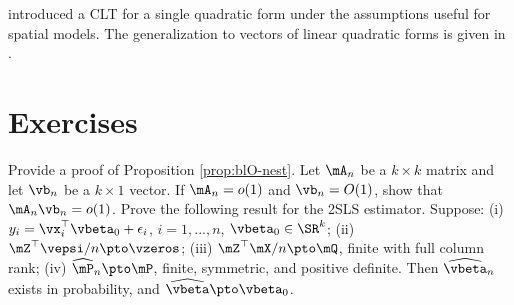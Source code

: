 \documentclass[english,12pt]{book}\usepackage[]{graphicx}\usepackage[]{xcolor}
\begin{document}
\cite{kelejian2001asymptotic} introduced a CLT for a single quadratic form under the assumptions useful for spatial models. The generalization to vectors of linear quadratic forms is given in \cite{kelejian2010specification}.


\section{Exercises}

\begin{exercises}
    \exercise Provide a proof of Proposition \ref{prop:blO-nest}.
    \exercise Let $\mA_n$ be a $k\times k$ matrix and let $\vb_n$ be a $k\times 1$ vector. If $\mA_n = o(1)$ and $\vb_n = O(1)$, show that $\mA_n\vb_n= o(1)$.
    \exercise Prove the following result for the 2SLS estimator. Suppose: (i) $y_i = \vx_i^\top\vbeta_0 + \epsilon_i$, $i= 1, ..., n$, $\vbeta_0\in \SR^k$; (ii) $\mZ^\top\vepsi/n\pto \vzeros$; (iii) $\mZ^\top\mX/n\pto \mQ$, finite with full column rank; (iv) $\widehat{\mP}_n\pto \mP$, finite, symmetric, and positive definite. Then $\widehat{\vbeta}_n$ exists in probability, and  $\widehat{\vbeta}\pto \vbeta_0$.
\end{exercises}   
\end{document}
